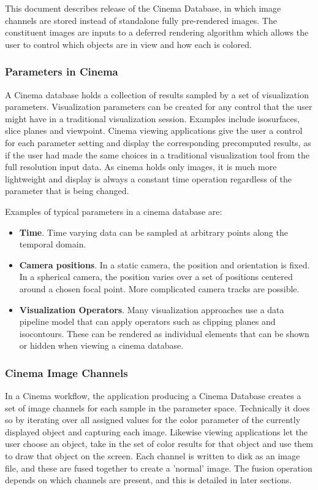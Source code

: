 
This document describes release \CinemaSpecVersion of the Cinema \chaplin Database, in which image channels are stored instead of standalone fully pre-rendered images. The constituent images are inputs to a deferred rendering algorithm which allows the user to control which objects are in view and how each is colored. 

\subsubsection{Parameters in Cinema}
\label{sec:parameters}

A Cinema database holds a collection of results sampled by a set of visualization parameters. Visualization parameters can be created for any control that the user might have in a traditional visualization session. Examples include isosurfaces, slice planes and viewpoint. Cinema viewing applications give the user a control for each parameter setting and display the corresponding precomputed results, as if the user had made the same choices in a traditional visualization tool from the full resolution input data. As cinema holds only images, it is much more lightweight and display is always a constant time operation regardless of the parameter that is being changed.

Examples of typical parameters in a cinema database are:
\begin{itemize}
\item \textbf{Time}. Time varying data can be sampled at arbitrary points along the temporal domain.
\item \textbf{Camera positions}. In a static camera, the position and orientation is fixed. In a spherical camera, the position varies over a set of positions centered around a chosen focal point. More complicated camera tracks are possible.
\item \textbf{Visualization Operators}. Many visualization approaches use a data pipeline model that can apply operators such as clipping planes and isocontours. These can be rendered as individual elements that can be shown or hidden when viewing a cinema database.
\end{itemize}

\subsubsection{Cinema Image Channels}
\label{sec:channels}
In a Cinema workflow, the application producing a Cinema Database creates a set of image channels for each sample in the parameter space. Technically it does so by iterating over all assigned values for the color parameter of the currently displayed object and capturing each image. Likewise viewing applications let the user choose an object, take in the set of color results for that object and use them to draw that object on the screen. Each channel is written to disk as an image file, and these are fused together to create a 'normal' image. The fusion operation depends on which channels are present, and this is detailed in later sections. 


